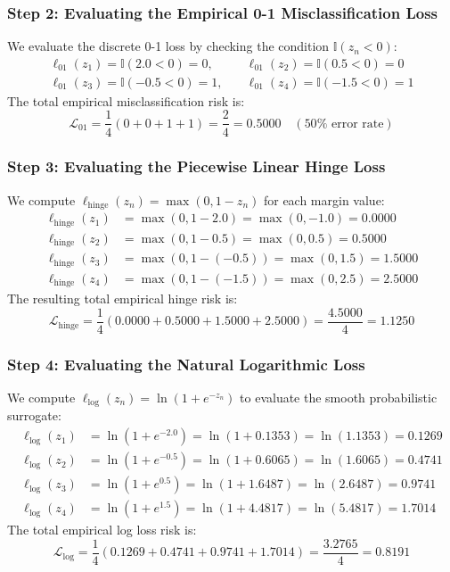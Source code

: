 \documentclass{article}
\begin{document}
\subsubsection{Step 2: Evaluating the Empirical 0-1 Misclassification Loss}
We evaluate the discrete 0-1 loss by checking the condition $\mathbb{I}(z_n < 0)$:
\begin{align*}
\ell_{01}(z_1) = \mathbb{I}(2.0 < 0) = 0, &\quad \ell_{01}(z_2) = \mathbb{I}(0.5 < 0) = 0 \\
\ell_{01}(z_3) = \mathbb{I}(-0.5 < 0) = 1, &\quad \ell_{01}(z_4) = \mathbb{I}(-1.5 < 0) = 1
\end{align*}
The total empirical misclassification risk is:
\begin{equation}
\mathcal{L}_{01} = \frac{1}{4}(0 + 0 + 1 + 1) = \frac{2}{4} = \mathbf{0.5000} \quad (50\% \text{ error rate})
\end{equation}

\subsubsection{Step 3: Evaluating the Piecewise Linear Hinge Loss}
We compute $\ell_{\text{hinge}}(z_n) = \max(0, 1 - z_n)$ for each margin value:
\begin{align*}
\ell_{\text{hinge}}(z_1) &= \max(0, 1 - 2.0) = \max(0, -1.0) = \mathbf{0.0000} \\
\ell_{\text{hinge}}(z_2) &= \max(0, 1 - 0.5) = \max(0, 0.5) = \mathbf{0.5000} \\
\ell_{\text{hinge}}(z_3) &= \max(0, 1 - (-0.5)) = \max(0, 1.5) = \mathbf{1.5000} \\
\ell_{\text{hinge}}(z_4) &= \max(0, 1 - (-1.5)) = \max(0, 2.5) = \mathbf{2.5000}
\end{align*}
The resulting total empirical hinge risk is:
\begin{equation}
\mathcal{L}_{\text{hinge}} = \frac{1}{4}(0.0000 + 0.5000 + 1.5000 + 2.5000) = \frac{4.5000}{4} = \mathbf{1.1250}
\end{equation}

\subsubsection{Step 4: Evaluating the Natural Logarithmic Loss}
We compute $\ell_{\text{log}}(z_n) = \ln(1 + e^{-z_n})$ to evaluate the smooth probabilistic surrogate:
\begin{align*}
\ell_{\text{log}}(z_1) &= \ln(1 + e^{-2.0}) = \ln(1 + 0.1353) = \ln(1.1353) = \mathbf{0.1269} \\
\ell_{\text{log}}(z_2) &= \ln(1 + e^{-0.5}) = \ln(1 + 0.6065) = \ln(1.6065) = \mathbf{0.4741} \\
\ell_{\text{log}}(z_3) &= \ln(1 + e^{0.5}) = \ln(1 + 1.6487) = \ln(2.6487) = \mathbf{0.9741} \\
\ell_{\text{log}}(z_4) &= \ln(1 + e^{1.5}) = \ln(1 + 4.4817) = \ln(5.4817) = \mathbf{1.7014}
\end{align*}
The total empirical log loss risk is:
\begin{equation}
\mathcal{L}_{\text{log}} = \frac{1}{4}(0.1269 + 0.4741 + 0.9741 + 1.7014) = \frac{3.2765}{4} = \mathbf{0.8191}
\end{equation}
\end{document}
